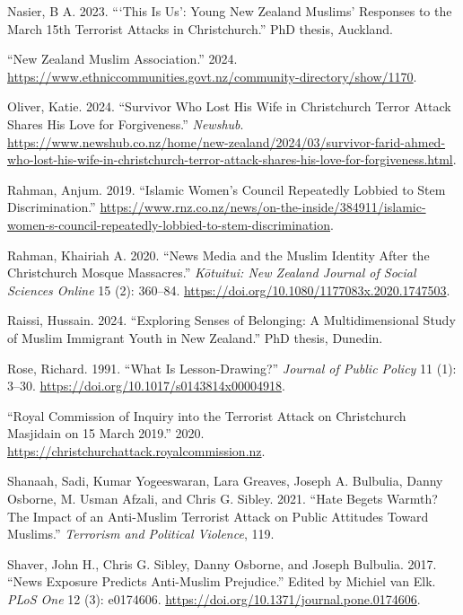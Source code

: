 \documentclass[
]{interact}
\newlength{\cslhangindent}
\newenvironment{CSLReferences}[2] %
 {\begin{list}{}{%
  \setlength{\itemindent}{0pt}
  \setlength{\leftmargin}{0pt}
  \setlength{\parsep}{0pt}
  \ifodd #1
   \setlength{\leftmargin}{\cslhangindent}
   \setlength{\itemindent}{-1\cslhangindent}
  \fi
  \setlength{\itemsep}{#2\baselineskip}}}
 {\end{list}}
\begin{document}
\begin{CSLReferences}{1}{0}
Nasier, B A. 2023. {``{`This Is {U}s'}: {Y}oung {N}ew {Z}ealand
{M}uslims' Responses to the {M}arch 15th {T}errorist {A}ttacks in
{C}hristchurch.''} PhD thesis, Auckland.

{``New Zealand Muslim Association.''} 2024.
\url{https://www.ethniccommunities.govt.nz/community-directory/show/1170}.

Oliver, Katie. 2024. {``Survivor Who Lost His Wife in Christchurch
Terror Attack Shares His Love for Forgiveness.''} \emph{Newshub}.
\url{https://www.newshub.co.nz/home/new-zealand/2024/03/survivor-farid-ahmed-who-lost-his-wife-in-christchurch-terror-attack-shares-his-love-for-forgiveness.html}.

Rahman, Anjum. 2019. {``Islamic {W}omen's {C}ouncil Repeatedly Lobbied
to Stem Discrimination.''}
\url{https://www.rnz.co.nz/news/on-the-inside/384911/islamic-women-s-council-repeatedly-lobbied-to-stem-discrimination}.

Rahman, Khairiah A. 2020. {``News Media and the Muslim Identity After
the Christchurch Mosque Massacres.''} \emph{K{ō}tuitui: New Zealand
Journal of Social Sciences Online} 15 (2): 360--84.
\url{https://doi.org/10.1080/1177083x.2020.1747503}.

Raissi, Hussain. 2024. {``Exploring Senses of Belonging: {A}
Multidimensional Study of {M}uslim Immigrant Youth in {N}ew
{Z}ealand.''} PhD thesis, Dunedin.

Rose, Richard. 1991. {``What Is Lesson-Drawing?''} \emph{Journal of
Public Policy} 11 (1): 3--30.
\url{https://doi.org/10.1017/s0143814x00004918}.

{``Royal {C}ommission of {I}nquiry into the Terrorist Attack on
{C}hristchurch {M}asjidain on 15 {M}arch 2019.''} 2020.
\url{https://christchurchattack.royalcommission.nz}.

Shanaah, Sadi, Kumar Yogeeswaran, Lara Greaves, Joseph A. Bulbulia,
Danny Osborne, M. Usman Afzali, and Chris G. Sibley. 2021. {``Hate
Begets Warmth? The Impact of an Anti-{M}uslim Terrorist Attack on Public
Attitudes Toward {M}uslims.''} \emph{Terrorism and Political Violence},
119.

Shaver, John H., Chris G. Sibley, Danny Osborne, and Joseph Bulbulia.
2017. {``News Exposure Predicts Anti-Muslim Prejudice.''} Edited by
Michiel van Elk. \emph{PLoS One} 12 (3): e0174606.
\url{https://doi.org/10.1371/journal.pone.0174606}.


\end{CSLReferences}
\end{document}
